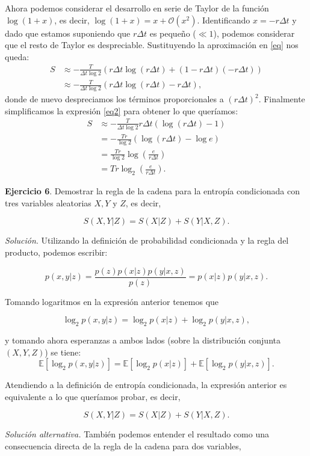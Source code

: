 \documentclass[11pt,a4paper]{article}
\begin{document}
Ahora podemos considerar el desarrollo en serie de Taylor de la función $\log(1+x)$, es decir, $\log(1+x)=x + \mathcal O(x^2)$. Identificando $x=-r\Delta t$ y dado que estamos suponiendo que $r\Delta t$ es pequeño ($\ll 1$), podemos considerar que el resto de Taylor es despreciable. Sustituyendo la aproximación en \eqref{eq} nos queda:
\begin{align*}
  S &\approx - \frac{T}{\Delta t \log 2}(r\Delta t \log(r\Delta t) + (1 - r\Delta t)(- r\Delta t))\\
  \tag{3}
  \label{eq2}
  &\approx - \frac{T}{\Delta t \log 2}(r\Delta t \log(r\Delta t) - r\Delta t),
\end{align*}
donde de nuevo despreciamos los términos proporcionales a $(r\Delta t)^2$. Finalmente simplificamos la expresión \eqref{eq2} para obtener lo que queríamos:
\begin{align*}
  S &\approx - \frac{T}{\Delta t \log 2}r\Delta t(\log(r\Delta t) - 1)\\
   &= - \frac{Tr}{\log 2}(\log(r\Delta t) - \log e)\\
   &= \frac{Tr}{\log 2}\log\left( \frac{e}{r\Delta t}\right)\\
   &= Tr \log_2\left( \frac{e}{r\Delta t}\right).
\end{align*}


\textbf{Ejercicio 6}. Demostrar la regla de la cadena para la entropía condicionada con tres variables aleatorias $X,Y$ y $Z$, es decir,

\[
S(X,Y|Z) = S(X|Z) + S(Y|X, Z).
\]

\textit{Solución}. Utilizando la definición de probabilidad condicionada y la regla del producto, podemos escribir:

\[
p(x,y|z)=\frac{p(z)p(x|z)p(y|x,z)}{p(z)}=p(x|z)p(y|x,z).
\]

Tomando logaritmos en la expresión anterior tenemos que

\[
\log_2 p(x,y|z)=\log_2 p(x|z)+\log_2 p(y|x,z),
\]

y tomando ahora esperanzas a ambos lados (sobre la distribución conjunta $(X,Y,Z)$) se tiene:
\[
\mathbb{E} \left[\log_2 p(x,y|z)\right] = \mathbb{E} \left[\log_2 p(x|z)\right] + \mathbb{E} \left[\log_2 p(y|x,z)\right].
\]

Atendiendo a la definición de entropía condicionada, la expresión anterior es equivalente a lo que queríamos probar, es decir,

\[
S(X,Y|Z)=S(X|Z)+S(Y|X,Z).
\]

\textit{Solución alternativa.} También podemos entender el resultado como una consecuencia directa de la regla de la cadena para dos variables,
\end{document}
